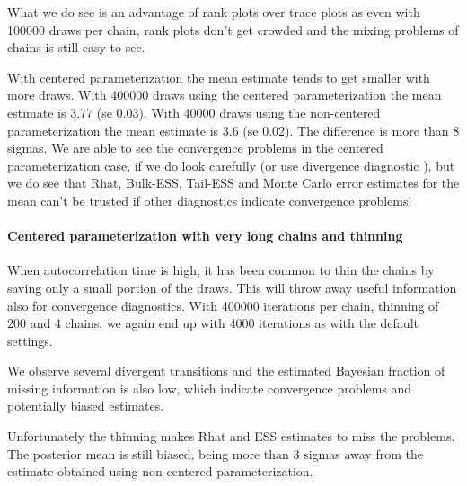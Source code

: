 \documentclass[american,]{article}
\let\oldparagraph\paragraph
\renewcommand{\paragraph}[1]{\oldparagraph{#1}\mbox{}}
\begin{document}
What we do see is an advantage of rank plots over trace plots as even
with 100000 draws per chain, rank plots don't get crowded and the mixing
problems of chains is still easy to see.

With centered parameterization the mean estimate tends to get smaller
with more draws. With 400000 draws using the centered parameterization
the mean estimate is 3.77 (se 0.03). With 40000 draws using the
non-centered parameterization the mean estimate is 3.6 (se 0.02). The
difference is more than 8 sigmas. We are able to see the convergence
problems in the centered parameterization case, if we do look carefully
(or use divergence diagnostic ), but we do see that Rhat, Bulk-ESS,
Tail-ESS and Monte Carlo error estimates for the mean can't be trusted
if other diagnostics indicate convergence problems!

\hypertarget{centered-parameterization-with-very-long-chains-and-thinning}{%
\paragraph{Centered parameterization with very long chains and
thinning}\label{centered-parameterization-with-very-long-chains-and-thinning}}

When autocorrelation time is high, it has been common to thin the chains
by saving only a small portion of the draws. This will throw away useful
information also for convergence diagnostics. With 400000 iterations per
chain, thinning of 200 and 4 chains, we again end up with 4000
iterations as with the default settings.

We observe several divergent transitions and the estimated Bayesian
fraction of missing information is also low, which indicate convergence
problems and potentially biased estimates.

Unfortunately the thinning makes Rhat and ESS estimates to miss the
problems. The posterior mean is still biased, being more than 3 sigmas
away from the estimate obtained using non-centered parameterization.
\end{document}
